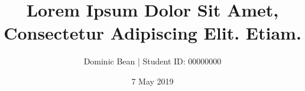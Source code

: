\documentclass[a4paper, 11pt]{article}
\title{Lorem Ipsum Dolor Sit Amet, Consectetur Adipiscing Elit. Etiam.}
\author{Dominic Bean | Student ID: 00000000}
\date{7 May 2019}
\begin{document}
    \maketitle

    \begin{abstract}
        
    \end{abstract}

    \tableofcontents
    \listoffigures
    \listoftables
    \clearpage

    
    
    
    
    
    \clearpage
    
    
    
    
    \clearpage
    
    
    
\end{document}
